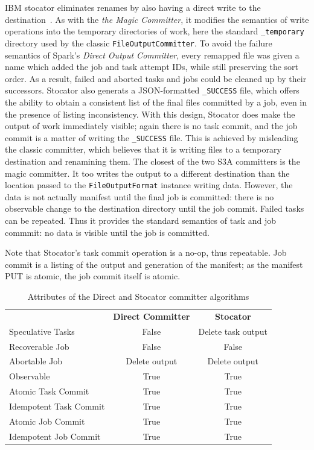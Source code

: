 \documentclass[conference]{IEEEtran}
\begin{document}
IBM stocator eliminates renames by also having a direct write to the
destination\ \cite{DBLP_journals_corr_abs-1709-01812}.
As with the \emph{the Magic Committer}, it modifies the semantics of write
operations into the temporary directories of work, here the standard
\texttt{\_temporary} directory used by the classic \texttt{FileOutputCommitter}.
To avoid the failure semantics of Spark's \emph{Direct Output Committer},
every remapped file was given a name which added the job and task attempt IDs,
while still preserving the sort order.
As a result, failed and aborted tasks and jobs could be cleaned up by their successors.
Stocator also generats a JSON-formatted \texttt{\_SUCCESS} file, which offers
the ability to obtain a consistent list of the final files committed by a job,
even in the presence of listing inconsistency.
With this design, Stocator does make the output of work immediately visible;
again there is no task commit, and the job commit is a matter of writing
the \texttt{\_SUCCESS} file.
This is achieved by misleading the classic committer, which believes that
it is writing files to a temporary destination and renamining them.
The closest of the two S3A committers is the magic committer.
It too writes the output to a different destination than the location passed
to the \texttt{FileOutputFormat} instance writing data.
However, the data is not actually manifest until the final job is committed:
there is no observable change to the destination directory until the job commit.
Failed tasks can be repeated.
Thus it provides the standard semantics of task and job commmit: no data is
visible until the job is committed.

Note that Stocator's task commit operation is a no-op, thus repeatable.
Job commit is a listing of the output and generation of the manifest;
as the manifest PUT is atomic, the job commit itself is atomic.

\begin{table}
  \label{tab:other-committer-attributes}
  \begin{tabular}{ l c c }
    \hline
    & \textbf{Direct Committer} & \textbf{Stocator} \\
    Speculative Tasks & False & Delete task output \\
    Recoverable Job & False & False \\
    Abortable Job & Delete output & Delete output \\
    Observable & True & True \\
    Atomic Task Commit & True & True \\
    Idempotent Task Commit & True & True \\
    Atomic Job Commit & True & True \\
    Idempotent Job Commit & True & True \\
    \hline
  \end{tabular}
  \caption{Attributes of the Direct and Stocator committer algorithms}
\end{table}
\end{document}
